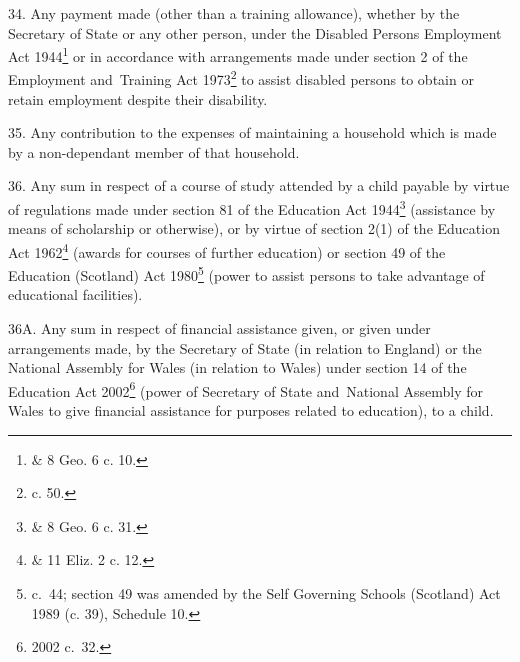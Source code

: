 \documentclass[12pt,a4paper]{article}
\begin{document}
\medskip

34.  Any payment made (other than a training allowance), whether by the Secretary of State or any other person, under the Disabled Persons Employment Act 1944\footnote{ \& 8 Geo. 6 c. 10.} or in accordance with arrangements made under section 2 of the Employment and~Training Act 1973\footnote{ c. 50.} to assist disabled persons to obtain or retain employment despite their disability.

\medskip

35.  Any contribution to the expenses of maintaining a household which is made by a non-dependant member of that household.

\medskip

36.  Any sum in respect of a course of study attended by a child payable by virtue of regulations made under section 81 of the Education Act 1944\footnote{ \& 8 Geo. 6 c. 31.} (assistance by means of scholarship or otherwise), or by virtue of section 2(1) of the Education Act 1962\footnote{ \& 11 Eliz. 2 c. 12.} (awards for courses of further education) or section 49 of the Education (Scotland) Act 1980\footnote{ c.~44; section 49 was amended by the Self Governing Schools (Scotland) Act 1989 (c. 39), Schedule 10.} (power to assist persons to take advantage of educational facilities).

\medskip

36A.  Any sum in respect of financial assistance given, or given under arrangements made, by the Secretary of State (in relation to England) or the National Assembly for Wales (in relation to Wales) under section 14 of the Education Act 2002\footnote{2002 c.\ 32.} (power of Secretary of State and~National Assembly for Wales to give financial assistance for purposes related to education), to a child.


\medskip
\end{document}
